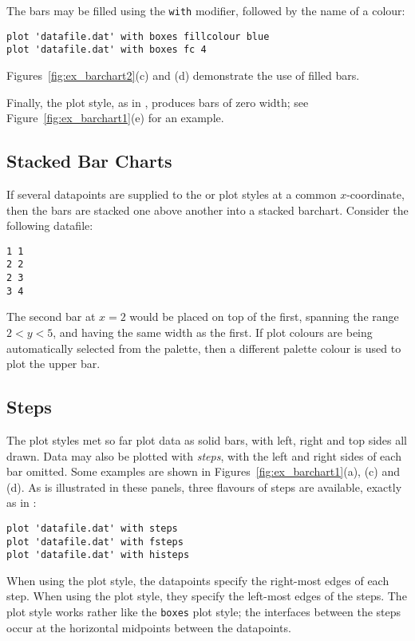 The bars may be filled using the {\tt with}  modifier,
followed by the name of a colour:

\begin{verbatim} 
plot 'datafile.dat' with boxes fillcolour blue
plot 'datafile.dat' with boxes fc 4
\end{verbatim}

\noindent Figures~\ref{fig:ex_barchart2}(c) and (d) demonstrate the use of
filled bars.

Finally, the  plot style, as in \gnuplot, produces bars of zero
width; see Figure~\ref{fig:ex_barchart1}(e) for an example.

\subsection{Stacked Bar Charts}

If several datapoints are supplied to the  or 
plot styles at a common $x$-coordinate, then the bars are stacked one above
another into a stacked barchart. Consider the following datafile:

\begin{verbatim} 
1 1
2 2
2 3
3 4
\end{verbatim}

\noindent The second bar at $x=2$ would be placed on top of the first, spanning
the range $2<y<5$, and having the same width as the first. If plot colours are
being automatically selected from the palette, then a different palette colour
is used to plot the upper bar.

\subsection{Steps}

The plot styles met so far plot data as solid bars, with left, right and top
sides all drawn. Data may also be plotted with {\it steps}, with the left and
right sides of each bar omitted. Some examples are shown in
Figures~\ref{fig:ex_barchart1}(a), (c) and (d).  As is illustrated in these
panels, three flavours of steps are available, exactly as in \gnuplot:

\begin{verbatim}
plot 'datafile.dat' with steps 
plot 'datafile.dat' with fsteps 
plot 'datafile.dat' with histeps
\end{verbatim}

When using the  plot style, the datapoints specify the right-most
edges of each step. When using the  plot style, they specify the
left-most edges of the steps. The  plot style works rather like
the {\tt boxes} plot style; the interfaces between the steps occur at the
horizontal midpoints between the datapoints.

